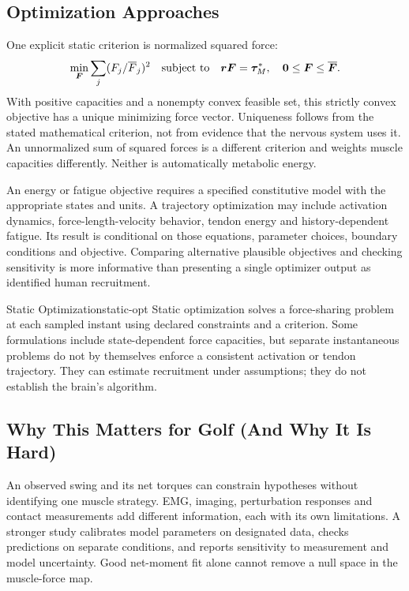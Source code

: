 \subsection{Optimization Approaches}

One explicit static criterion is normalized squared force:
\[
\min_{\bm F}\sum_j(F_j/\overline F_j)^2
\quad\hbox{subject to}\quad
\bm r\bm F=\bm\tau_M^*,\quad
\bm0\leq\bm F\leq\overline{\bm F}.
\]
With positive capacities and a nonempty convex feasible set, this strictly convex objective has a unique minimizing force vector. Uniqueness follows from the stated mathematical criterion, not from evidence that the nervous system uses it. An unnormalized sum of squared forces is a different criterion and weights muscle capacities differently. Neither is automatically metabolic energy.

An energy or fatigue objective requires a specified constitutive model with the appropriate states and units. A trajectory optimization may include activation dynamics, force-length-velocity behavior, tendon energy and history-dependent fatigue. Its result is conditional on those equations, parameter choices, boundary conditions and objective. Comparing alternative plausible objectives and checking sensitivity is more informative than presenting a single optimizer output as identified human recruitment.

\begin{definition}{Static Optimization}{static-opt}
Static optimization solves a force-sharing problem at each sampled instant using declared constraints and a criterion. Some formulations include state-dependent force capacities, but separate instantaneous problems do not by themselves enforce a consistent activation or tendon trajectory. They can estimate recruitment under assumptions; they do not establish the brain's algorithm.
\end{definition}

\subsection{Why This Matters for Golf (And Why It Is Hard)}

An observed swing and its net torques can constrain hypotheses without identifying one muscle strategy. EMG, imaging, perturbation responses and contact measurements add different information, each with its own limitations. A stronger study calibrates model parameters on designated data, checks predictions on separate conditions, and reports sensitivity to measurement and model uncertainty. Good net-moment fit alone cannot remove a null space in the muscle-force map.

